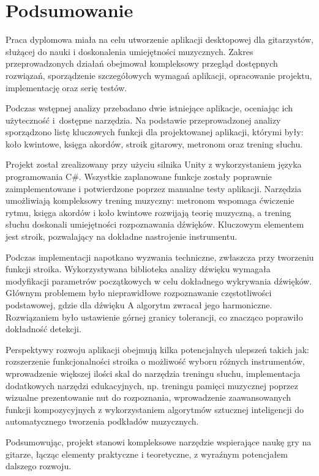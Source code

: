\chapter{Podsumowanie}

Praca dyplomowa miała na celu utworzenie aplikacji desktopowej dla gitarzystów, służącej do nauki i doskonalenia umiejętności muzycznych. Zakres przeprowadzonych działań obejmował kompleksowy przegląd dostępnych rozwiązań, sporządzenie szczegółowych wymagań aplikacji, opracowanie projektu, implementację oraz serię testów.

Podczas wstępnej analizy przebadano dwie istniejące aplikacje, oceniając ich użyteczność i~dostępne narzędzia. Na podstawie przeprowadzonej analizy sporządzono listę kluczowych funkcji dla projektowanej aplikacji, którymi były: koło kwintowe, księga akordów, stroik gitarowy, metronom oraz trening słuchu.

Projekt został zrealizowany przy użyciu silnika Unity z wykorzystaniem języka programowania C\#. Wszystkie zaplanowane funkcje zostały poprawnie zaimplementowane i potwierdzone poprzez manualne testy aplikacji. Narzędzia umożliwiają kompleksowy trening muzyczny: metronom wspomaga ćwiczenie rytmu, księga akordów i koło kwintowe rozwijają teorię muzyczną, a trening słuchu doskonali umiejętności rozpoznawania dźwięków. Kluczowym elementem jest stroik, pozwalający na dokładne nastrojenie instrumentu.

Podczas implementacji napotkano wyzwania techniczne, zwłaszcza przy tworzeniu funkcji stroika. Wykorzystywana biblioteka analizy dźwięku wymagała modyfikacji parametrów początkowych w celu dokładnego wykrywania dźwięków. Głównym problemem było nieprawidłowe rozpoznawanie częstotliwości podstawowej, gdzie dla dźwięku A algorytm zwracał jego harmoniczne. Rozwiązaniem było ustawienie górnej granicy tolerancji, co znacząco poprawiło dokładność detekcji.

Perspektywy rozwoju aplikacji obejmują kilka potencjalnych ulepszeń takich jak: rozszerzenie funkcjonalności stroika o możliwość wyboru różnych instrumentów, wprowadzenie większej ilości skal do narzędzia treningu słuchu, implementacja dodatkowych narzędzi edukacyjnych, np. treningu pamięci muzycznej poprzez wizualne prezentowanie nut do rozpoznania, wprowadzenie zaawansowanych funkcji kompozycyjnych z wykorzystaniem algorytmów sztucznej inteligencji do automatycznego tworzenia podkładów muzycznych.

Podsumowując, projekt stanowi kompleksowe narzędzie wspierające naukę gry na gitarze, łącząc elementy praktyczne i teoretyczne, z wyraźnym potencjałem dalszego rozwoju.
